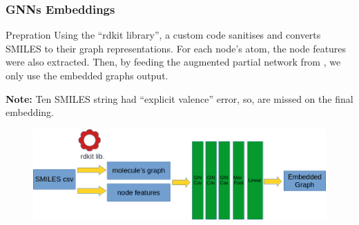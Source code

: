 \documentclass[usenames,dvipsnames]{beamer}
\begin{document}
\begin{frame}
	\frametitle{GNNs Embeddings}
	\begin{block}{Prepration}
     Using the ``rdkit library'', a custom code sanitises and converts SMILES to their graph representations. For each node's atom, the node features were also extracted. Then, by feeding the augmented partial network from \cite{btaa921}, we only use the embedded graphs output.     
     \newline
     \newline     
     
    \textbf{Note:} Ten SMILES string had ``explicit valence'' error, so, are missed on the final embedding.
	\end{block}
	
	\begin{figure}
		\includegraphics[width=1.0\textwidth]{arch}
	\end{figure}
\end{frame}
\end{document}
